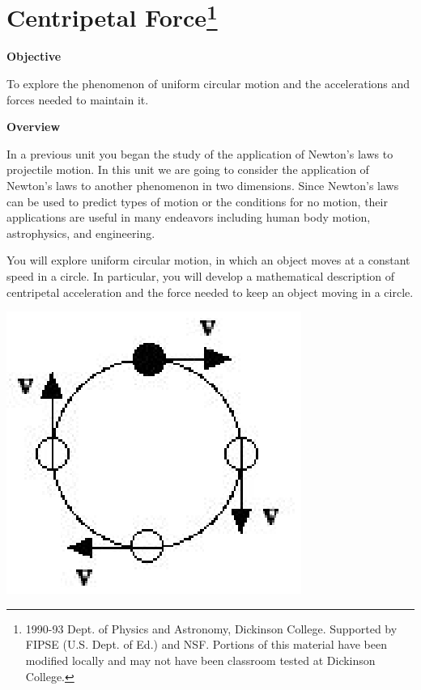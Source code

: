 
\section{Centripetal Force\footnote{
1990-93 Dept. of Physics and Astronomy, Dickinson College. Supported by FIPSE
(U.S. Dept. of Ed.) and NSF. Portions of this material have been modified locally
and may not have been classroom tested at Dickinson College.
}}

\makelabheader %

\textbf{Objective} 

To explore the phenomenon of uniform circular motion and the accelerations and
forces needed to maintain it.

\textbf{Overview} 

In a previous unit you began the study of the application of Newton's laws to
projectile motion. In this unit we are going to consider the application of
Newton's laws to another phenomenon in two dimensions. Since Newton's laws can
be used to predict types of motion or the conditions for no motion, their applications
are useful in many endeavors including human body motion, astrophysics, and
engineering.

You will explore uniform circular motion, in which an object moves at a constant
speed in a circle. In particular, you will develop a mathematical description
of centripetal acceleration and the force needed to keep an object moving in
a circle.

\vspace{0.3cm}
{\par\centering \includegraphics{centripetal/centripetal_fig1.eps} \par}
\vspace{0.3cm}

